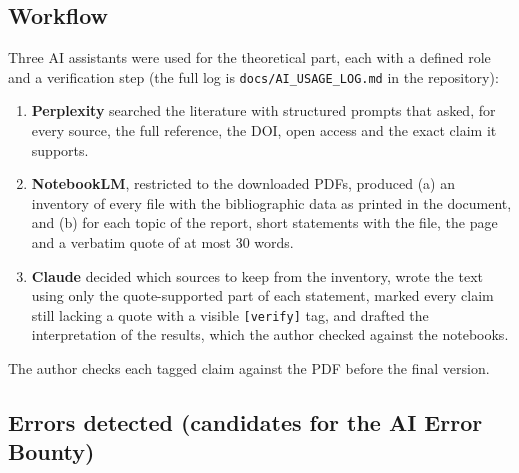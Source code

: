 
\subsection*{Workflow}

Three AI assistants were used for the theoretical part, each with a defined role and a verification
step (the full log is \texttt{docs/\allowbreak{}AI\_\allowbreak{}USAGE\_\allowbreak{}LOG.\allowbreak{}md} in the repository):
\begin{enumerate}
  \item \textbf{Perplexity} searched the literature with structured prompts that asked, for every
        source, the full reference, the DOI, open access and the exact claim it supports.
  \item \textbf{NotebookLM}, restricted to the downloaded PDFs, produced (a) an inventory of every file
        with the bibliographic data as printed in the document, and (b) for each topic of the report,
        short statements with the file, the page and a verbatim quote of at most 30 words.
  \item \textbf{Claude} decided which sources to keep from the inventory, wrote the text using only the
        quote-supported part of each statement, marked every claim still lacking a quote with a
        visible \texttt{[verify]} tag, and drafted the interpretation of the results, which the author
        checked against the notebooks.
\end{enumerate}
The author checks each tagged claim against the PDF before the final version.

\subsection*{Errors detected (candidates for the AI Error Bounty)}

